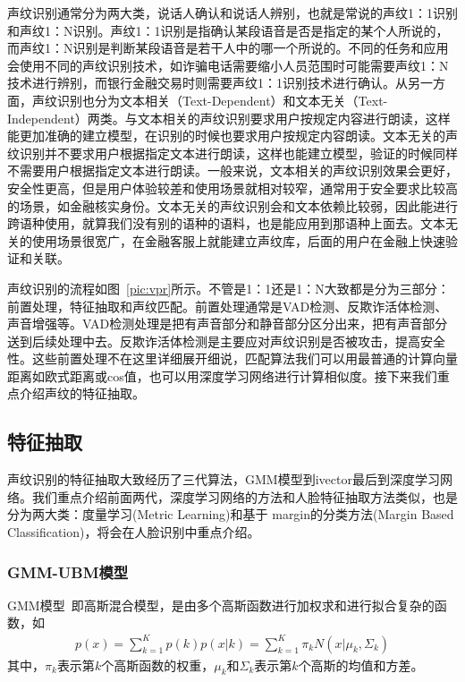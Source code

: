 \documentclass[graybox,envcountchap,sectrefs]{svmono}
\begin{document}
声纹识别通常分为两大类，说话人确认和说话人辨别，也就是常说的声纹1：1识别和声纹1：N识别。声纹1：1识别是指确认某段语音是否是指定的某个人所说的，而声纹1：N识别是判断某段语音是若干人中的哪一个所说的。不同的任务和应用会使用不同的声纹识别技术，如诈骗电话需要缩小人员范围时可能需要声纹1：N技术进行辨别，而银行金融交易时则需要声纹1：1识别技术进行确认。从另一方面，声纹识别也分为文本相关（Text-Dependent）和文本无关（Text-Independent）两类。与文本相关的声纹识别要求用户按规定内容进行朗读，这样能更加准确的建立模型，在识别的时候也要求用户按规定内容朗读。文本无关的声纹识别并不要求用户根据指定文本进行朗读，这样也能建立模型，验证的时候同样不需要用户根据指定文本进行朗读。一般来说，文本相关的声纹识别效果会更好，安全性更高，但是用户体验较差和使用场景就相对较窄，通常用于安全要求比较高的场景，如金融核实身份。文本无关的声纹识别会和文本依赖比较弱，因此能进行跨语种使用，就算我们没有别的语种的语料，也是能应用到那语种上面去。文本无关的使用场景很宽广，在金融客服上就能建立声纹库，后面的用户在金融上快速验证和关联。

声纹识别的流程如图~\ref{pic:vpr}所示。不管是1：1还是1：N大致都是分为三部分：前置处理，特征抽取和声纹匹配。前置处理通常是VAD检测、反欺诈活体检测、声音增强等。VAD检测处理是把有声音部分和静音部分区分出来，把有声音部分送到后续处理中去。反欺诈活体检测是主要应对声纹识别是否被攻击，提高安全性。这些前置处理不在这里详细展开细说，匹配算法我们可以用最普通的计算向量距离如欧式距离或cos值，也可以用深度学习网络进行计算相似度。接下来我们重点介绍声纹的特征抽取。
\begin{figure*}
	\centering
	\caption{声纹识别流程}
	\label{pic:vpr}
\end{figure*}

\subsection{特征抽取}
声纹识别的特征抽取大致经历了三代算法，GMM模型到ivector最后到深度学习网络。我们重点介绍前面两代，深度学习网络的方法和人脸特征抽取方法类似，也是分为两大类：度量学习(Metric Learning)和基于 margin的分类方法(Margin Based Classification)，将会在人脸识别中重点介绍。

\subsubsection{GMM-UBM模型}
GMM模型~\cite{reynolds1995speaker}即高斯混合模型，是由多个高斯函数进行加权求和进行拟合复杂的函数，如
\begin{equation}
\label{eq:gmm}
\begin{aligned}
p(x) = \sum_{k=1}^K p(k)p(x|k) = \sum_{k=1}^K \pi_k N(x|\mu_k, \Sigma_k)
\end{aligned}
\end{equation}
其中，$\pi_k$表示第$k$个高斯函数的权重，$\mu_k$和$\Sigma_k$表示第$k$个高斯的均值和方差。
\end{document}
